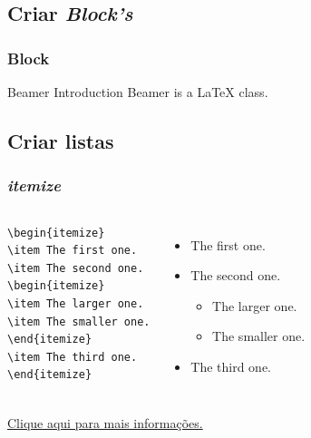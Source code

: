 \documentclass[article]{beamer}%
\begin{document}
\subsection{Criar \emph{Block's}}
\begin{frame}
\frametitle{Block}

\begin{block}{Beamer Introduction}
Beamer is a { \LaTeX} class.
\end{block}

\end{frame}

\subsection{Criar listas}
\begin{frame}[fragile]
\frametitle{\emph{itemize}}

\begin{columns}
\begin{block}
\scriptsize{
\begin{verbatim}
\begin{itemize}
\item The first one.
\item The second one.
\begin{itemize}
\item The larger one.
\item The smaller one.
\end{itemize}
\item The third one.
\end{itemize}
\end{verbatim}
}
\end{block}

\begin{itemize}
\item The first one.
\item The second one.
\begin{itemize}
\item The larger one.
\item The smaller one.
\end{itemize}
\item The third one.
\end{itemize}
\end{columns}
\vspace{1.5cm}
\href{https://tug.ctan.org/macros/latex/contrib/beamer/doc/beameruserguide.pdf}{Clique aqui para mais informações.}
\end{frame}
\end{document}
